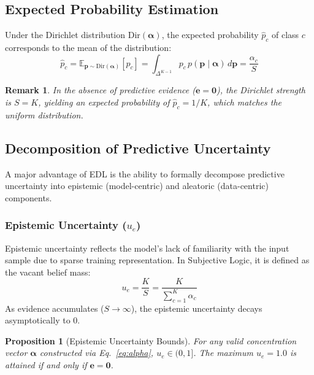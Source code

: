 \documentclass[11pt]{article}
\newtheorem{proposition}{Proposition}
\newtheorem{remark}{Remark}
\newcommand{\Dir}{\text{Dir}}
\newcommand{\E}{\mathbb{E}}
\begin{document}
\subsection{Expected Probability Estimation}\label{subsec:expected_prob}

Under the Dirichlet distribution $\Dir(\bm{\alpha})$, the expected probability $\hat{p}_c$ of class $c$ corresponds to the mean of the distribution:
\begin{equation}\label{eq:expected_p}
    \hat{p}_c = \E_{\bm{p} \sim \Dir(\bm{\alpha})}[p_c] = \int_{\Delta^{K-1}} p_c \, p(\bm{p} \mid \bm{\alpha}) \, d\bm{p} = \frac{\alpha_c}{S}
\end{equation}

\begin{remark}
In the absence of predictive evidence ($\bm{e} = \bm{0}$), the Dirichlet strength is $S = K$, yielding an expected probability of $\hat{p}_c = 1/K$, which matches the uniform distribution.
\end{remark}

\subsection{Decomposition of Predictive Uncertainty}\label{subsec:uncertainty}

A major advantage of EDL is the ability to formally decompose predictive uncertainty into epistemic (model-centric) and aleatoric (data-centric) components.

\subsubsection{Epistemic Uncertainty ($u_e$)}

Epistemic uncertainty reflects the model's lack of familiarity with the input sample due to sparse training representation. In Subjective Logic, it is defined as the vacant belief mass:
\begin{equation}\label{eq:u_e}
    u_e = \frac{K}{S} = \frac{K}{\sum_{c=1}^K \alpha_c}
\end{equation}
As evidence accumulates ($S \to \infty$), the epistemic uncertainty decays asymptotically to $0$.

\begin{proposition}[Epistemic Uncertainty Bounds]
For any valid concentration vector $\bm{\alpha}$ constructed via Eq.~\ref{eq:alpha}, $u_e \in (0, 1]$. The maximum $u_e = 1.0$ is attained if and only if $\bm{e} = \bm{0}$.
\end{proposition}
\end{document}
